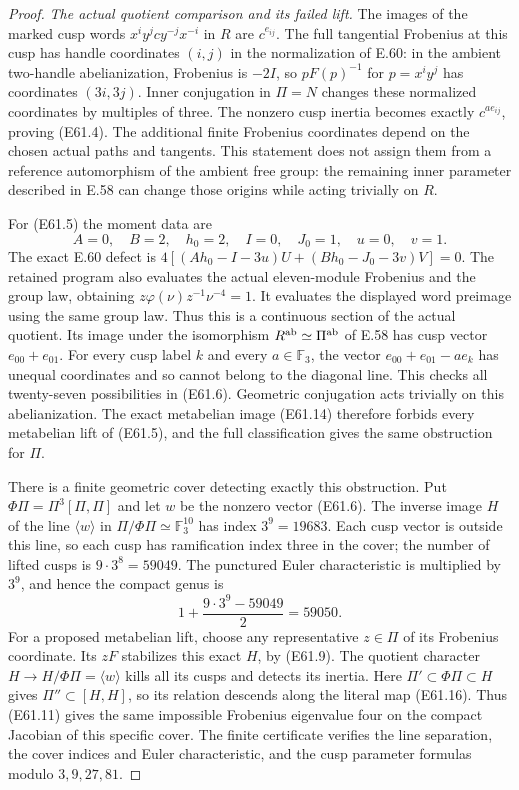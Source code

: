 \begin{proof}
\emph{The actual quotient comparison and its failed lift.}
The images of the marked cusp words
$x^iy^j c y^{-j}x^{-i}$ in $R$ are $c^{e_{ij}}$.
The full tangential Frobenius at this cusp has handle
coordinates $(i,j)$ in the normalization of E.60: in the
ambient two-handle abelianization, Frobenius is $-2I$, so
$pF(p)^{-1}$ for $p=x^iy^j$ has coordinates $(3i,3j)$.
Inner conjugation in $\Pi=N$ changes these normalized
coordinates by multiples of three. The nonzero cusp inertia
becomes exactly $c^{a e_{ij}}$, proving (E61.4).
The additional finite Frobenius coordinates depend on the
chosen actual paths and tangents. This statement does not
assign them from a reference automorphism of the ambient
free group: the remaining inner parameter described in E.58
can change those origins while acting trivially on $R$.

For (E61.5) the moment data are
\[
       A=0,\quad B=2,\quad h_0=2,\quad I=0,\quad J_0=1,
              \quad u=0,\quad v=1.
 \tag{E61.12}
\]
The exact E.60 defect is
$4[(Ah_0-I-3u)U+(Bh_0-J_0-3v)V]=0$.
The retained program also evaluates the actual eleven-module
Frobenius and the group law, obtaining
$z\varphi(\nu)z^{-1}\nu^{-4}=1$.
It evaluates the displayed word preimage using the same group
law. Thus this is a continuous section of the actual quotient.
Its image under the isomorphism $R^{\rm ab}\simeq\Pi^{\rm ab}$
of E.58 has cusp vector $e_{00}+e_{01}$. For every cusp label
$k$ and every $a\in\mathbb F_3$, the vector
$e_{00}+e_{01}-a e_k$ has unequal coordinates and so cannot
belong to the diagonal line. This checks all twenty-seven
possibilities in (E61.6). Geometric conjugation acts trivially
on this abelianization. The exact metabelian image (E61.14)
therefore forbids every metabelian lift of (E61.5), and the
full classification gives the same obstruction for $\Pi$.

There is a finite geometric cover detecting exactly this
obstruction. Put $\Phi\Pi=\Pi^3[\Pi,\Pi]$ and let $w$ be
the nonzero vector (E61.6). The inverse image $H$ of the line
$\langle w\rangle$ in $\Pi/\Phi\Pi\simeq\mathbb F_3^{10}$
has index $3^9=19683$. Each cusp vector is outside this line,
so each cusp has ramification index three in the cover;
the number of lifted cusps is $9\cdot3^8=59049$.
The punctured Euler characteristic is multiplied by $3^9$,
and hence the compact genus is
\[
       1+\frac{9\cdot3^9-59049}{2}=59050.
 \tag{E61.13}
\]
For a proposed metabelian lift, choose any representative
$z\in\Pi$ of its Frobenius coordinate. Its $zF$ stabilizes this exact
$H$, by (E61.9). The quotient character
$H\to H/\Phi\Pi=\langle w\rangle$ kills all its cusps and
detects its inertia. Here $\Pi'\subset\Phi\Pi\subset H$
gives $\Pi''\subset[H,H]$, so its relation descends along
the literal map (E61.16). Thus (E61.11) gives the same impossible
Frobenius eigenvalue four on the compact Jacobian of this
specific cover. The finite certificate verifies the line
separation, the cover indices and Euler characteristic, and
the cusp parameter formulas modulo $3,9,27,81$.
\end{proof}
